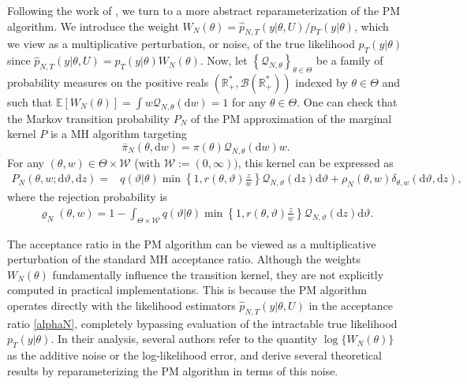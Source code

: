 \documentclass[pdflatex,sn-mathphys-num]{sn-jnl}
\newcommand{\E}{\mathbb{E}}
\theoremstyle{thmstyleone}
\theoremstyle{thmstyletwo}
\theoremstyle{thmstylethree}
\begin{document}
Following the work of \cite{andrieu_pseudo-marginal_2009, pitt_properties_2012, andrieu_convergence_2015,doucet_efficient_2015, sherlock_efficiency_2015, andrieu_establishing_2016, schmon_large-sample_2021}, we turn to a more abstract reparameterization of the PM algorithm. We introduce the weight $W_N(\theta) = \widehat{p}_{N,T}(y|\theta,U)/p_T(y|\theta)$, which we view as a multiplicative perturbation, or noise, of the true likelihood $p_T(y|\theta)$ since  $\widehat{p}_{N,T}(y|\theta, U)=p_T(y|\theta) W_N(\theta)$. Now, let $\left\{\mathcal{Q}_{N,\theta}\right\}_{\theta \in \Theta}$ be a family of probability measures on the positive reals $\left(\mathbb{R}_{+}^{*}, \mathcal{B}\left(\mathbb{R}_{+}^{*}\right)\right)$ indexed by $\theta \in \Theta$ and such that $\E[W_N(\theta)]=\int w \mathcal{Q}_{N,\theta}(\mathrm{d} w)=1$ for any $\theta \in \Theta$. One can check that the Markov transition probability ${P_N}$ of the PM approximation of the marginal kernel $P$ is a MH algorithm targeting 
$$\bar{\pi}_N(\theta, \mathrm{d} w)= \pi(\theta) \mathcal{Q}_{N,\theta}(\mathrm{d} w) w.$$
For any $(\theta, w) \in \Theta \times \mathcal{W}$ (with $\mathcal{W}:=(0, \infty))$, this kernel can be expressed as
\begin{align}
{P_N}(\theta, w ; \mathrm{d} \vartheta,\mathrm{d} z)= & q(\vartheta|\theta) \min \left\{1, r(\theta, \vartheta) \frac{z}{w}\right\} \mathcal{Q}_{N,\vartheta}(\mathrm{d} z) \mathrm{d}\vartheta + {\rho_N}(\theta, w)\delta_{\theta, w}(\mathrm{d} \vartheta ,\mathrm{d} z) ,
\label{equa5}
\end{align}
where the rejection probability is
\begin{align}
     \varrho_{N}(\theta, w) = 1- \int
    _{\Theta \times \mathcal{W}} q(\vartheta|\theta) \min\left\{1,  r(\theta, \vartheta) \frac{z}{w}\right\}
    \mathcal{Q}_{N,\vartheta}(\mathrm{d}z) \mathrm{d}\vartheta.
\label{varrho_repar}
\end{align}

The acceptance ratio in the PM algorithm can be viewed as a multiplicative perturbation of the standard MH acceptance ratio. Although the weights $W_N(\theta)$ fundamentally influence the transition kernel, they are not explicitly computed in practical implementations. This is because the PM algorithm operates directly with the likelihood estimators $\widehat{p}_{N,T}(y | \theta, U)$ in the acceptance ratio \eqref{alphaN}, completely bypassing evaluation of the intractable true likelihood $p_T(y | \theta)$. In their analysis, several authors \cite{schmon_large-sample_2021, pitt_properties_2012, doucet_efficient_2015, sherlock_efficiency_2015, deligiannidis_correlated_2018} refer to the quantity $\log\{W_N(\theta)\}$ as the additive noise or the log-likelihood error, and derive several theoretical results by reparameterizing the PM algorithm in terms of this noise.
\end{document}
